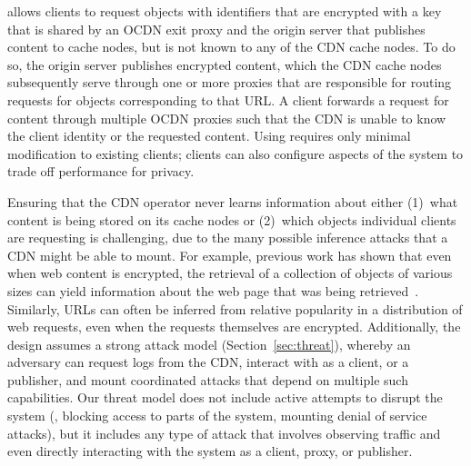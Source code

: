 \system{} allows clients to request objects with identifiers that
are encrypted with a key that is shared by an OCDN exit proxy and the origin server
that publishes content to cache nodes, but is not known to any of the CDN
cache nodes. To do so, the origin server publishes encrypted content, 
which the CDN cache nodes subsequently serve through one or more proxies that are responsible for routing requests for objects corresponding to that URL.  A client forwards a request for content through multiple OCDN proxies such that the CDN is unable to know the client identity or the requested content. Using \system{} requires only minimal modification to existing clients; clients can also configure aspects of the system to trade off performance for privacy.

Ensuring that the CDN operator never learns information about either (1)~what
content is being stored on its cache nodes or (2)~which objects individual
clients are requesting is challenging, due to the many possible inference
attacks that a CDN might be able to mount. For example, previous work has
shown that even when web content is encrypted, the retrieval of a collection
of objects of various sizes can yield information about the web page that was
being retrieved~\cite{panchenko2016website, cai2012touching}. Similarly, URLs
can often be inferred from relative popularity in a distribution of web
requests, even when the requests themselves are encrypted. Additionally, the
\system{} design assumes a strong attack model (Section~\ref{sec:threat}),
whereby an adversary can request logs from the CDN, interact with \system{} as
a client, or a publisher, and mount coordinated attacks that depend on
multiple such capabilities. Our threat model does not include active attempts
to disrupt the system (\eg, blocking access to parts of the system, mounting
denial of service attacks), but it includes any type of attack
that involves observing traffic and even directly interacting with the system
as a client, proxy, or publisher.

